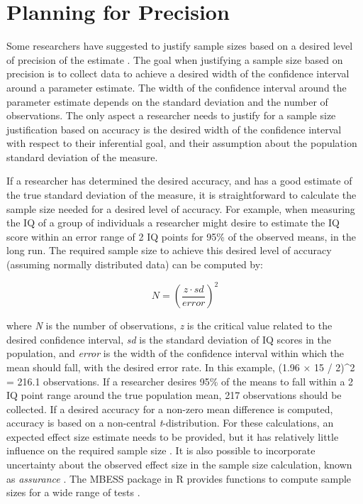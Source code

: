 \documentclass[
  oneside]{krantz}
\begin{document}
\hypertarget{planning-for-precision}{%
\section{Planning for Precision}\label{planning-for-precision}}

Some researchers have suggested to justify sample sizes based on a desired level of precision of the estimate \citep{cumming_introduction_2016, maxwell_sample_2008, kruschke_rejecting_2018}. The goal when justifying a sample size based on precision is to collect data to achieve a desired width of the confidence interval around a parameter estimate. The width of the confidence interval around the parameter estimate depends on the standard deviation and the number of observations. The only aspect a researcher needs to justify for a sample size justification based on accuracy is the desired width of the confidence interval with respect to their inferential goal, and their assumption about the population standard deviation of the measure.

If a researcher has determined the desired accuracy, and has a good estimate of the true standard deviation of the measure, it is straightforward to calculate the sample size needed for a desired level of accuracy. For example, when measuring the IQ of a group of individuals a researcher might desire to estimate the IQ score within an error range of 2 IQ points for 95\% of the observed means, in the long run. The required sample size to achieve this desired level of accuracy (assuming normally distributed data) can be computed by:

\[N = \left(\frac{z \cdot sd}{error}\right)^2\]

where \emph{N} is the number of observations, \emph{z} is the critical value related to the desired confidence interval, \emph{sd} is the standard deviation of IQ scores in the population, and \emph{error} is the width of the confidence interval within which the mean should fall, with the desired error rate. In this example, (1.96 × 15 / 2)\^{}2 = 216.1 observations. If a researcher desires 95\% of the means to fall within a 2 IQ point range around the true population mean, 217 observations should be collected. If a desired accuracy for a non-zero mean difference is computed, accuracy is based on a non-central \emph{t}-distribution. For these calculations, an expected effect size estimate needs to be provided, but it has relatively little influence on the required sample size \citep{maxwell_sample_2008}. It is also possible to incorporate uncertainty about the observed effect size in the sample size calculation, known as \emph{assurance} \citep{kelley_sample_2006}. The MBESS package in R provides functions to compute sample sizes for a wide range of tests \citep{kelley_confidence_2007}.
\end{document}
